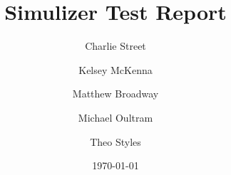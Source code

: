 \documentclass[12pt, a4paper]{article}
\title{\huge\textbf{Simulizer Test Report}}
\author{
  Charlie Street
  \and
  Kelsey McKenna
  \and
  Matthew Broadway
  \and
  Michael Oultram
  \and
  Theo Styles
}
\date{\today}
\begin{document}
\maketitle



\begin{landscape}

\end{landscape}



\end{document}
